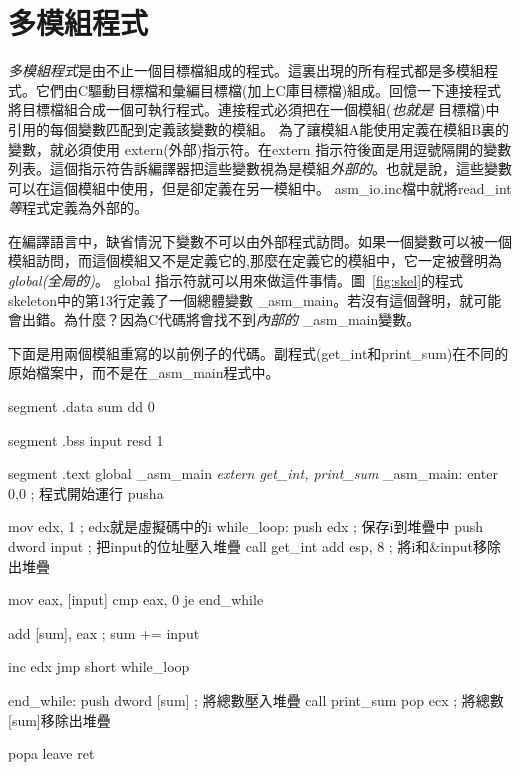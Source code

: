\section{多模組程式}

\emph{多模組程式}是由不止一個目標檔組成的程式。這裏出現的所有程式都是多模組程式。它們由C驅動目標檔和彙編目標檔(加上C庫目標檔)組成。回憶一下連接程式將目標檔組合成一個可執行程式。連接程式必須把在一個模組(\emph{也就是}
目標檔)中引用的每個變數匹配到定義該變數的模組。
為了讓模組A能使用定義在模組B裏的變數，就必須使用{\code
extern(外部)}指示符。在{\code extern}
指示符後面是用逗號隔開的變數列表。這個指示符告訴編譯器把這些變數視為是模組\emph{外部的}。也就是說，這些變數可以在這個模組中使用，但是卻定義在另一模組中。{\code
asm\_io.inc}檔中就將{\code read\_int}\emph{等}程式定義為外部的。

在編譯語言中，缺省情況下變數不可以由外部程式訪問。如果一個變數可以被一個模組訪問，而這個模組又不是定義它的,那麼在定義它的模組中，它一定被聲明為\emph{global(全局的)}。{\code
global} 指示符就可以用來做這件事情。圖~\ref{fig:skel}的程式skeleton中的第13行定義了一個總體變數 {\code
\_asm\_main}。若沒有這個聲明，就可能會出錯。為什麼？因為C代碼將會找不到\emph{內部的} {\code \_asm\_main}變數。

下面是用兩個模組重寫的以前例子的代碼。副程式({\code get\_int}和{\code print\_sum})在不同的原始檔案中，而不是在{\code \_asm\_main}程式中。

\begin{AsmCodeListing}[label=main4.asm,commandchars=\\\{\}]

segment .data
sum     dd   0

segment .bss
input   resd 1

segment .text
        global  _asm_main
\textit{        extern  get_int, print_sum}
_asm_main:
        enter   0,0               ; 程式開始運行
        pusha

        mov     edx, 1            ; edx就是虛擬碼中的i
while_loop:
        push    edx               ; 保存i到堆疊中
        push    dword input       ; 把input的位址壓入堆疊
        call    get_int
        add     esp, 8            ; 將i和&input移除出堆疊

        mov     eax, [input]
        cmp     eax, 0
        je      end_while

        add     [sum], eax        ; sum += input

        inc     edx
        jmp     short while_loop

end_while:
        push    dword [sum]       ; 將總數壓入堆疊
        call    print_sum
        pop     ecx               ; 將總數[sum]移除出堆疊

        popa
        leave
        ret
\end{AsmCodeListing}

